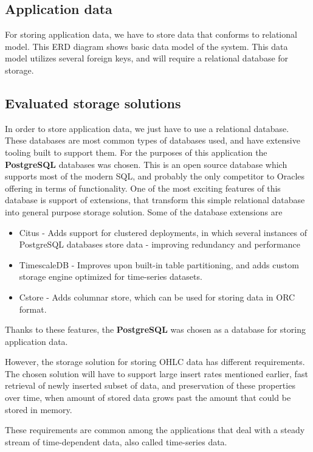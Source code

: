 \subsection{Application data}
For storing application data, we have to store data that conforms to relational model.
This ERD diagram shows basic data model of the system. This data model utilizes several foreign keys, and will require
a relational database for storage.

\subsection{Evaluated storage solutions}
In order to store application data, we just have to use a relational database. These databases are most common types of databases used,
and have extensive tooling built to support them. For the purposes of this application the \textbf{PostgreSQL} databases was chosen.
This is an open source database which supports most of the modern SQL, and probably the only competitor to Oracles offering
in terms of functionality. One of the most exciting features of this database is support of extensions, that transform
this simple relational database into general purpose storage solution. Some of the database extensions are
\begin{itemize}
    \item Citus - Adds support for clustered deployments, in which several instances of PostgreSQL databases store
        data - improving redundancy and performance
    \item TimescaleDB - Improves upon built-in table partitioning, and adds custom storage engine optimized
        for time-series datasets.
    \item Cstore - Adds columnar store, which can be used for storing data in ORC format.
\end{itemize}
Thanks to these features, the \textbf{PostgreSQL} was chosen as a database for storing application data.

However, the storage solution for storing OHLC data has different requirements. The chosen solution will have
to support large insert rates mentioned earlier, fast retrieval of newly inserted subset of data, and preservation
of these properties over time, when amount of stored data grows past the amount that could be stored in memory.

These requirements are common among the applications that deal with a steady stream of time-dependent data, also called
time-series data.

